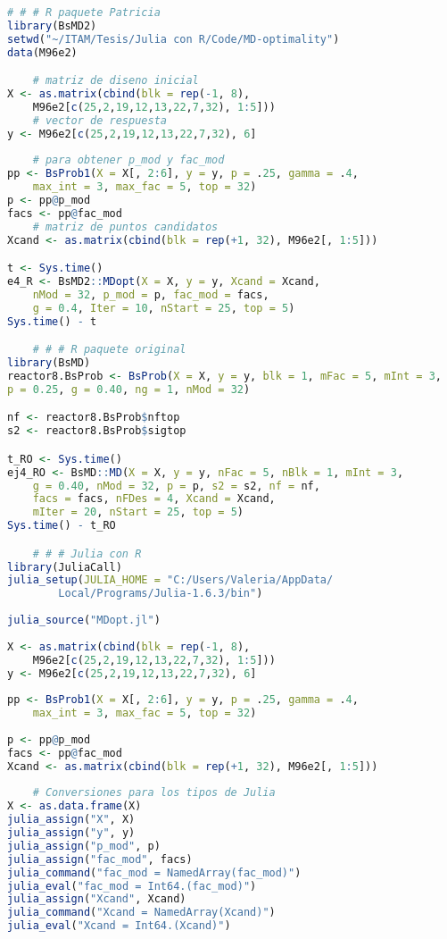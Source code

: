 
\begin{lstlisting}[language=R]
	# # # R paquete Patricia
library(BsMD2)
setwd("~/ITAM/Tesis/Julia con R/Code/MD-optimality")
data(M96e2)

	# matriz de diseno inicial
X <- as.matrix(cbind(blk = rep(-1, 8), 
	M96e2[c(25,2,19,12,13,22,7,32), 1:5]))
	# vector de respuesta
y <- M96e2[c(25,2,19,12,13,22,7,32), 6]
	
	# para obtener p_mod y fac_mod
pp <- BsProb1(X = X[, 2:6], y = y, p = .25, gamma = .4, 
	max_int = 3, max_fac = 5, top = 32)
p <- pp@p_mod
facs <- pp@fac_mod
	# matriz de puntos candidatos
Xcand <- as.matrix(cbind(blk = rep(+1, 32), M96e2[, 1:5]))

t <- Sys.time()
e4_R <- BsMD2::MDopt(X = X, y = y, Xcand = Xcand, 
	nMod = 32, p_mod = p, fac_mod = facs, 
	g = 0.4, Iter = 10, nStart = 25, top = 5)
Sys.time() - t

	# # # R paquete original 
library(BsMD)
reactor8.BsProb <- BsProb(X = X, y = y, blk = 1, mFac = 5, mInt = 3, 
p = 0.25, g = 0.40, ng = 1, nMod = 32)

nf <- reactor8.BsProb$nftop
s2 <- reactor8.BsProb$sigtop

t_RO <- Sys.time()
ej4_RO <- BsMD::MD(X = X, y = y, nFac = 5, nBlk = 1, mInt = 3, 
	g = 0.40, nMod = 32, p = p, s2 = s2, nf = nf, 
	facs = facs, nFDes = 4, Xcand = Xcand, 
	mIter = 20, nStart = 25, top = 5)
Sys.time() - t_RO

	# # # Julia con R 
library(JuliaCall)
julia_setup(JULIA_HOME = "C:/Users/Valeria/AppData/
		Local/Programs/Julia-1.6.3/bin")
	
julia_source("MDopt.jl")
	
X <- as.matrix(cbind(blk = rep(-1, 8), 
	M96e2[c(25,2,19,12,13,22,7,32), 1:5]))
y <- M96e2[c(25,2,19,12,13,22,7,32), 6]
	
pp <- BsProb1(X = X[, 2:6], y = y, p = .25, gamma = .4, 
	max_int = 3, max_fac = 5, top = 32)
	
p <- pp@p_mod
facs <- pp@fac_mod
Xcand <- as.matrix(cbind(blk = rep(+1, 32), M96e2[, 1:5]))
	
	# Conversiones para los tipos de Julia
X <- as.data.frame(X)
julia_assign("X", X)
julia_assign("y", y)
julia_assign("p_mod", p)
julia_assign("fac_mod", facs)
julia_command("fac_mod = NamedArray(fac_mod)")
julia_eval("fac_mod = Int64.(fac_mod)")
julia_assign("Xcand", Xcand)
julia_command("Xcand = NamedArray(Xcand)")
julia_eval("Xcand = Int64.(Xcand)")
	

\end{lstlisting}
